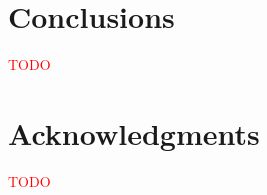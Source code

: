 \documentclass[sn-mathphys]{sn-jnl}%
\theoremstyle{thmstyleone}%
\theoremstyle{thmstyletwo}%
\theoremstyle{thmstylethree}%
\begin{document}


\section{Conclusions}

\textcolor{red}{TODO}



\section{Acknowledgments}

\textcolor{red}{TODO}





\end{document}
